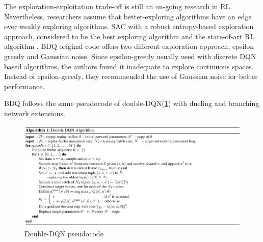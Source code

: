 The exploration-exploitation trade-off is still an on-going research in RL. Nevertheless, researchers assume that better-exploring algorithms have an edge over weakly exploring algorithms. SAC with a robust entropy-based exploration approach, considered to be the best exploring algorithm and the state-of-art RL algorithm \cite{Haarnoja2018}. BDQ original code offers two different exploration approach, epsilon greedy and Gaussian noise. Since epsilon-greedy usually used with discrete DQN based algorithms, the authors found it inadequate to explore continuous spaces. Instead of epsilon-greedy, they recommended the use of Gaussian noise for better performance.

BDQ follows the same pseudocode of double-DQN(\ref{fig:bdqalgo}) with dueling and branching network extensions.

\begin{figure}[htbp] 
    \centering
    \includegraphics[width=1.0\textwidth]{figures/BDQalgo}
    \caption{Double-DQN pseudocode \cite{Wang2016}}
    \label{fig:bdqalgo}
\end{figure}